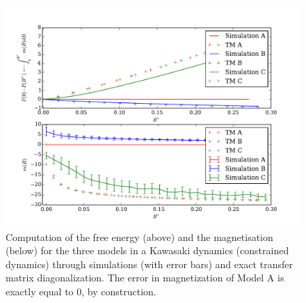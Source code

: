 \begin{figure}
  \includegraphics[width=13cm]{tm/ModKaw.pdf}
  \caption{Computation of the free energy (above) and the magnetisation (below) for the three models in a Kawasaki dynamics (constrained dynamics) through simulations (with error bars) and exact transfer matrix diagonalization. The error in magnetization of Model A is exactly equal to 0, by construction.}
  \label{compKaw}  
\end{figure}
